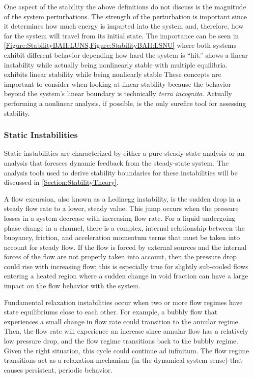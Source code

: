 One aspect of the stability the above definitions do not discuss is the magnitude of the system perturbations.
The strength of the perturbation is important since it determines how much energy is imparted into the system and, therefore, how far the system will travel from its initial state.
The importance can be seen in \cref{Figure:StabilityBAH:LUNS,Figure:StabilityBAH:LSNU} where both systems exhibit different behavior depending how hard the system is ``hit.''
 shows a linear instability while actually being nonlinearly stable with multiple equilibria.
 exhibits linear stability while being nonliearly stable
These concepts are important to consider when looking at linear stability because the behavior beyond the system's linear boundary is technically \textit{terra incognita}.
Actually performing a nonlinear analysis, if possible, is the only surefire tool for assessing stability.


\subsubsection{Static Instabilities}
Static instabilities are characterized by either a pure steady-state analysis or an analysis that foresees dynamic feedback from the steady-state system.
The analysis tools used to derive stability boundaries for these instabilities will be discussed in \cref{Section:StabilityTheory}.

A flow excursion, also known as a Ledinegg instability, is the sudden drop in a steady flow rate to a lower, steady value.
This jump occurs when the pressure losses in a system decrease with increasing flow rate.
For a liquid undergoing phase change in a channel, there is a complex, internal relationship between the buoyancy, friction, and acceleration momentum terms that must be taken into account for steady flow.
If the flow is forced by external sources and the internal forces of the flow are not properly taken into account, then the pressure drop could rise with increasing flow; this is especially true for slightly sub-cooled flows entering a heated region where a sudden change in void fraction can have a large impact on the flow behavior with the system.

Fundamental relaxation instabilities occur when two or more flow regimes have state equilibriums close to each other.
For example, a bubbly flow that experiences a small change in flow rate could transition to the annular regime.
Then, the flow rate will experience an increase since annular flow has a relatively low pressure drop, and the flow regime transitions back to the bubbly regime.
Given the right situation, this cycle could continue ad infinitum.
The flow regime transitions act as a relaxation mechanism (in the dynamical system sense) that causes persistent, periodic behavior.

